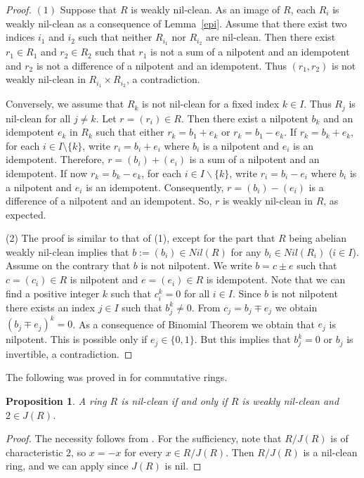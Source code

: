 \documentclass[12]{amsart}
\newtheorem{prop}[thm]{Proposition}
\theoremstyle{definition}
\numberwithin{equation}{section}
\begin{document}
\begin{proof}
$(1)$ Suppose that $R$ is weakly nil-clean. As an image of $R$, each $R_i$ is weakly nil-clean
as a consequence of Lemma~\ref{epi}. Assume that there exist two indices $i_1$ and $i_2$ such that
 neither $R_{i_1}$ nor $R_{i_2}$ are nil-clean. Then there exist $r_1\in R_1$ and $r_2\in R_2$ such that
$r_1$ is not a sum of a nilpotent and an idempotent and $r_2$ is not a difference of a nilpotent and an idempotent. Thus $(r_1,r_2)$ is not weakly nil-clean in $R_{i_1}\times R_{i_2}$, a contradiction.

Conversely, we assume that $R_k$ is not nil-clean for a fixed index $k\in I$.
Thus $R_j$ is nil-clean for all $j\neq k$. Let $r=(r_i)\in R$. Then there exist a nilpotent $b_k$ and an idempotent $e_k$ in $R_k$ such that either $r_k=b_1+e_k$ or $r_k=b_1-e_k$.  If $r_k=b_k+e_k$, for each $i\in I\setminus \{k\}$, write $r_i=b_i+e_i$ where $b_i$ is a nilpotent and $e_i$ is an idempotent. Therefore, $r=(b_i)+(e_i)$ is a sum of a nilpotent and an idempotent. If now $r_k=b_k-e_k$, for each $i\in I\backslash \{k\}$, write $r_i=b_i-e_i$ where $b_i$ is a nilpotent and $e_i$ is an idempotent. Consequently, $r=(b_i)-(e_i)$ is a difference of a nilpotent and an idempotent. So, $r$ is weakly nil-clean in $R$, as expected.

(2) The proof is similar to that of (1), except for the part that $R$ being abelian weakly nil-clean implies that
$b:=(b_i)\in Nil(R)$ for any $b_i\in Nil(R_i)$ ($i\in I$). Assume on the contrary that $b$ is not nilpotent. We write $b=c\pm e$ such that $c=(c_i)\in R$ is nilpotent and $e=(e_i)\in R$ is idempotent. Note that we can find a positive integer $k$ such that $c_i^k=0$ for all $i\in I$. Since $b$ is not nilpotent there exists an index $j\in I$ such that $b_j^k\neq 0$. From $c_j=b_j\mp e_j$
we obtain $(b_j\mp e_j)^k=0$. As a consequence of Binomial Theorem we obtain that $e_j$ is nilpotent. This is possible only if $e_j\in \{0,1\}$. But this implies that $b_j^k=0$ or $b_j$ is invertible, a contradiction.
\end{proof}

The following was proved in \cite[Proposition 1.10]{DM14} for commutative rings.

\begin{prop}\label{char-2}
A ring $R$ is nil-clean if and only if  $R$ is weakly nil-clean and $2\in J(R)$.
\end{prop}

\begin{proof}
The necessity follows from \cite[Proposition 3.14]{D13}. For the sufficiency, note that $R/J(R)$ is of characteristic $2$, so $x=-x$ for every $x\in R/J(R)$. Then $R/J(R)$ is a nil-clean ring, and we can apply \cite[Corollary 3.17]{D13} since $J(R)$ is nil. \end{proof}
\end{document}
